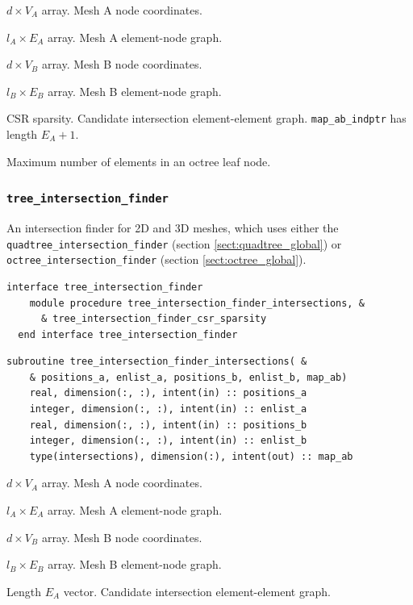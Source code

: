 \documentclass{article}
\begin{document}
\begin{description}[font=\ttfamily\bfseries,leftmargin=2.2\parindent,labelindent=1.7\parindent,noitemsep]
  \item[positions\_a] $d \times V_A$ array. Mesh A node coordinates.
  \item[enlist\_a] $l_A \times E_A$ array. Mesh A element-node graph.
  \item[positions\_b] $d \times V_B$ array. Mesh B node coordinates.
  \item[enlist\_b] $l_B \times E_B$ array. Mesh B element-node graph.
  \item[map\_ab\_indices, map\_ab\_indptr] CSR sparsity. Candidate intersection
    element-element graph. \linebreak \verb+map_ab_indptr+ has length $E_A + 1$.
  \item[max\_size] Maximum number of elements in an octree leaf node.
\end{description}

\subsubsection{\texttt{tree\_intersection\_finder}}

An intersection finder for 2D and 3D meshes, which uses either the
\verb+quadtree_intersection_finder+ (section \ref{sect:quadtree_global}) or
\verb+octree_intersection_finder+ (section \ref{sect:octree_global}).

\begin{lstlisting}[language=FORTRAN]
  interface tree_intersection_finder
    module procedure tree_intersection_finder_intersections, &
      & tree_intersection_finder_csr_sparsity
  end interface tree_intersection_finder
\end{lstlisting}

\begin{lstlisting}[language=FORTRAN]
  subroutine tree_intersection_finder_intersections( &
    & positions_a, enlist_a, positions_b, enlist_b, map_ab)
    real, dimension(:, :), intent(in) :: positions_a
    integer, dimension(:, :), intent(in) :: enlist_a
    real, dimension(:, :), intent(in) :: positions_b
    integer, dimension(:, :), intent(in) :: enlist_b
    type(intersections), dimension(:), intent(out) :: map_ab
\end{lstlisting}

\begin{description}[font=\ttfamily\bfseries,leftmargin=2.2\parindent,labelindent=1.7\parindent,noitemsep]
  \item[positions\_a] $d \times V_A$ array. Mesh A node coordinates.
  \item[enlist\_a] $l_A \times E_A$ array. Mesh A element-node graph.
  \item[positions\_b] $d \times V_B$ array. Mesh B node coordinates.
  \item[enlist\_b] $l_B \times E_B$ array. Mesh B element-node graph.
  \item[map\_ab] Length $E_A$ vector. Candidate intersection element-element
    graph.
\end{description}
\end{document}
